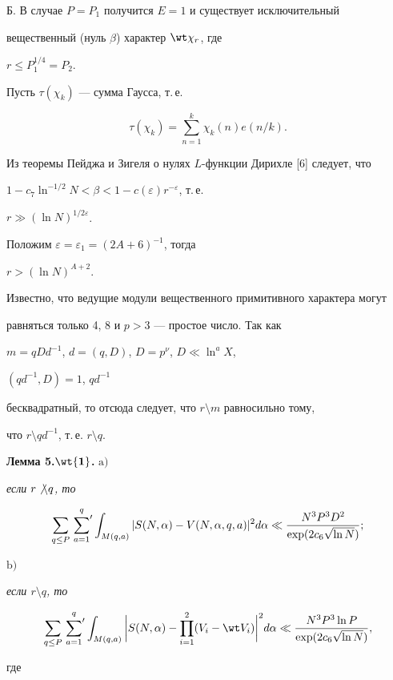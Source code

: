 Б. В случае $P=P_1$ получится $E=1$ и существует исключительный 


вещественный (нуль $\beta$) характер $\wt \chi_r$, где


$r\le P_1^{1/4}=P_2$.


Пусть $\tau(\chi_k)$ --- сумма Гаусса, т.\,е.


$$


\tau(\chi_k)=\sum_{n=1}^k \chi_k(n)e(n/k).


$$


Из теоремы Пейджа и Зигеля о нулях $L$-функции Дирихле [6] следует, что


$1-c_7\ln^{-1/2}N<\beta<1-c(\varepsilon)r^{-\varepsilon}$, т.\,е.


$r\gg (\ln N)^{1/2\varepsilon}$.


Положим $\varepsilon= \varepsilon_1=(2A+6)^{-1}$, тогда


$r>(\ln N)^{A+2}$.





Известно, что ведущие модули вещественного примитивного характера могут


равняться только 4, 8 и $p>3$ --- простое число. Так как


$m=qDd^{-1}$, $d=(q,D)$, $D=p^\nu$, $D\ll \ln^a X$,


$(qd^{-1}, D)=1$, $qd^{-1}$


бесквадратный, то отсюда следует, что $r\setminus m$ равносильно тому,


что $r\setminus qd^{-1}$, т.\,е. $r\setminus q$. 


\medskip





{\bf Лемма 5.$\wt{\bold 1}$.} $\mathrm a)$


{\it если $r\not\setminus q$, то}


$$


\sum_{q\le P}\sideset{}{'}\sum_{a=1}^q \int_{M(q,a)}


|S(N,\alpha) - V(N,\alpha, q, a)|^2 d\alpha\ll 


\frac{N^3P^3D^2}{\exp(2c_6\sqrt{\ln N})};


$$





$\mathrm b)$ {\it если $r\setminus q$, то


$$


\sum_{q\le P}\sideset{}{'}\sum_{a=1}^q \int_{M(q,a)}


\bigg|S(N,\alpha) - \prod_{i=1}^2(V_i-\wt V_i)\bigg|^2 d\alpha\ll 


\frac{N^3P^3\ln P}{\exp(2c_6\sqrt{\ln N})},


$$


где}


